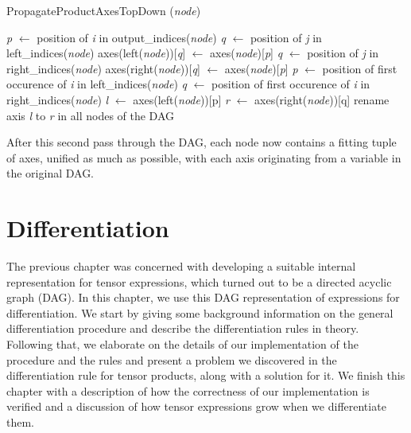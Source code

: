 \documentclass[12pt, a4paper]{report} %
\begin{document}
\begin{algorithm}[ht!]
    \caption[Top-Down Axis Propagation in Product Node]{PropagateProductAxesTopDown (\textit{node})}
    \label{alg:product_axes_2}
    \begin{algorithmic}
            \State \textit{p} $\gets$ position of \textit{i} in output\_indices(\textit{node})
                \State \textit{q} $\gets$ position of \textit{j} in left\_indices(\textit{node})
                    \State axes(left(\textit{node}))[\textit{q}] $\gets$ axes(\textit{node})[\textit{p}]
                \EndIf
            \EndFor
                \State \textit{q} $\gets$ position of \textit{j} in right\_indices(\textit{node})
                    \State axes(right(\textit{node}))[\textit{q}] $\gets$ axes(\textit{node})[\textit{p}]
                \EndIf
            \EndFor
        \EndFor
         
            \State \textit{p} $\gets$ position of first occurence of \textit{i} in left\_indices(\textit{node})
                \State \textit{q} $\gets$ position of first occurence of \textit{i} in right\_indices(\textit{node})
                \State \textit{l} $\gets$ axes(left(\textit{node}))[p]
                \State \textit{r} $\gets$ axes(right(\textit{node}))[q]
                \State rename axis \textit{l} to \textit{r} in all nodes of the DAG
            \EndIf
        \EndFor
    \end{algorithmic}
\end{algorithm}

After this second pass through the DAG, each node now contains a fitting tuple of axes, unified as much as possible, with each axis originating from a variable in the original DAG.

\FloatBarrier
\chapter{Differentiation}
The previous chapter was concerned with developing a suitable internal representation for tensor expressions, which turned out to be a directed acyclic graph (DAG).
In this chapter, we use this DAG representation of expressions for differentiation.
We start by giving some background information on the general differentiation procedure and describe the differentiation rules in theory.
Following that, we elaborate on the details of our implementation of the procedure and the rules and present a problem we discovered in the differentiation rule for tensor products, along with a solution for it.
We finish this chapter with a description of how the correctness of our implementation is verified and a discussion of how tensor expressions grow when we differentiate them.
\end{document}
